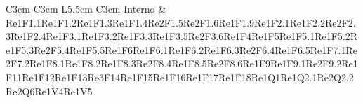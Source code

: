 \begin{longtable}{C{3cm} C{3cm} L{5.5cm} C{3cm}}
Interno & Re1F1.1\newline Re1F1.2\newline Re1F1.3\newline Re1F1.4\newline Re2F1.5\newline Re2F1.6\newline Re1F1.9\newline Re1F2.1\newline Re1F2.2\newline Re2F2.3\newline Re1F2.4\newline Re1F3.1\newline Re1F3.2\newline Re1F3.3\newline Re1F3.5\newline Re2F3.6\newline Re1F4\newline Re1F5\newline Re1F5.1\newline Re1F5.2\newline Re1F5.3\newline Re2F5.4\newline Re1F5.5\newline Re1F6\newline Re1F6.1\newline Re1F6.2\newline Re1F6.3\newline Re2F6.4\newline Re1F6.5\newline Re1F7.1\newline Re2F7.2\newline Re1F8.1\newline Re1F8.2\newline Re1F8.3\newline Re2F8.4\newline Re1F8.5\newline Re2F8.6\newline Re1F9\newline Re1F9.1\newline Re2F9.2\newline Re1F11\newline Re1F12\newline Re1F13\newline Re3F14\newline Re1F15\newline Re1F16\newline Re1F17\newline Re1F18\newline Re1Q1\newline  Re1Q2.1\newline Re2Q2.2\newline Re2Q6\newline Re1V4\newline Re1V5\\



\end{longtable}
